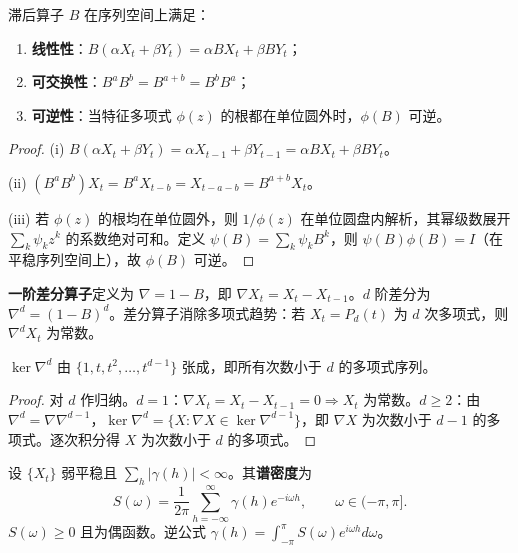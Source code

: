 \begin{property}[滞后算子的代数性质]\label{prop:ts_lag_algebra}
滞后算子 $B$ 在序列空间上满足：
\begin{enumerate}[label=(\roman*)]
    \item \textbf{线性性}：$B(\alpha X_t + \beta Y_t) = \alpha B X_t + \beta B Y_t$；
    \item \textbf{可交换性}：$B^a B^b = B^{a+b} = B^b B^a$；
    \item \textbf{可逆性}：当特征多项式 $\phi(z)$ 的根都在单位圆外时，$\phi(B)$ 可逆。
\end{enumerate}
\end{property}

\begin{proof}
(i) $B(\alpha X_t + \beta Y_t) = \alpha X_{t-1} + \beta Y_{t-1} = \alpha BX_t + \beta BY_t$。

(ii) $(B^a B^b)X_t = B^a X_{t-b} = X_{t-a-b} = B^{a+b}X_t$。

(iii) 若 $\phi(z)$ 的根均在单位圆外，则 $1/\phi(z)$ 在单位圆盘内解析，其幂级数展开 $\sum_k \psi_k z^k$ 的系数绝对可和。定义 $\psi(B) = \sum_k \psi_k B^k$，则 $\psi(B)\phi(B) = I$（在平稳序列空间上），故 $\phi(B)$ 可逆。
\end{proof}

\begin{definition}[差分算子]\label{def:ts_diff_operator}
\textbf{一阶差分算子}定义为 $\nabla = 1-B$，即 $\nabla X_t=X_t-X_{t-1}$。$d$ 阶差分为 $\nabla^d=(1-B)^d$。差分算子消除多项式趋势：若 $X_t=P_d(t)$ 为 $d$ 次多项式，则 $\nabla^d X_t$ 为常数。
\end{definition}

\begin{lemma}[差分算子的零空间]\label{lem:ts_diff_kernel}
$\ker\nabla^d$ 由 $\{1,t,t^2,\dots,t^{d-1}\}$ 张成，即所有次数小于 $d$ 的多项式序列。
\end{lemma}

\begin{proof}
对 $d$ 作归纳。$d=1$：$\nabla X_t=X_t-X_{t-1}=0\Rightarrow X_t$ 为常数。$d\ge2$：由 $\nabla^d=\nabla\nabla^{d-1}$，$\ker\nabla^d=\{X:\nabla X\in\ker\nabla^{d-1}\}$，即 $\nabla X$ 为次数小于 $d-1$ 的多项式。逐次积分得 $X$ 为次数小于 $d$ 的多项式。
\end{proof}

\begin{definition}[谱密度]\label{def:ts_spectral_density}
设 $\{X_t\}$ 弱平稳且 $\sum_h|\gamma(h)|<\infty$。其\textbf{谱密度}为
\[
S(\omega)=\frac{1}{2\pi}\sum_{h=-\infty}^{\infty}\gamma(h)e^{-i\omega h},\qquad \omega\in(-\pi,\pi].
\]
$S(\omega)\ge0$ 且为偶函数。逆公式 $\gamma(h)=\int_{-\pi}^{\pi}S(\omega)e^{i\omega h}d\omega$。
\end{definition}

